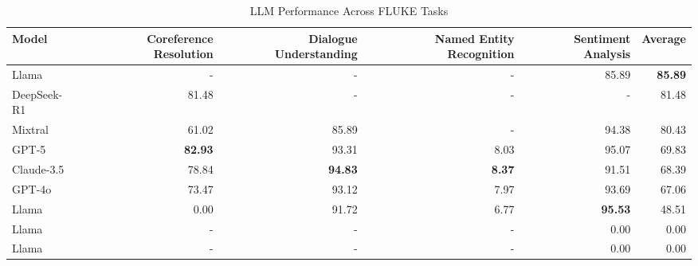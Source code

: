 \begin{table}[htbp]
\centering
\caption{LLM Performance Across FLUKE Tasks}
\label{tab:cross_task_comparison}
\begin{tabular}{lrrrrr}
\toprule
Model & Coreference Resolution & Dialogue Understanding & Named Entity Recognition & Sentiment Analysis & Average \\
\midrule
Llama & - & - & - & 85.89 & \textbf{85.89} \\
DeepSeek-R1 & 81.48 & - & - & - & 81.48 \\
Mixtral & 61.02 & 85.89 & - & 94.38 & 80.43 \\
GPT-5 & \textbf{82.93} & 93.31 & 8.03 & 95.07 & 69.83 \\
Claude-3.5 & 78.84 & \textbf{94.83} & \textbf{8.37} & 91.51 & 68.39 \\
GPT-4o & 73.47 & 93.12 & 7.97 & 93.69 & 67.06 \\
Llama & 0.00 & 91.72 & 6.77 & \textbf{95.53} & 48.51 \\
Llama & - & - & - & 0.00 & 0.00 \\
Llama & - & - & - & 0.00 & 0.00 \\
\bottomrule
\end{tabular}
\end{table}

